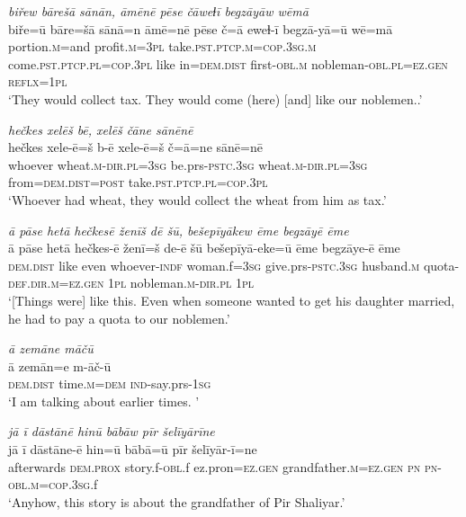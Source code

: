 \ea \label{BP.12}
\textit{biřew bārešā sānān, āmēnē pēse čāweɫī begzāyāw wēmā} \\ 
\gll biře=ū bāre=šā sānā=n āmē=nē pēse č=ā eweɫ-ī begzā-yā=ū wē=mā \\ 
 portion\textsc{.m}=and profit\textsc{.m}\textsc{=3pl} take\textsc{.pst}\textsc{.ptcp}\textsc{.m}\textsc{=cop}\textsc{.3sg}\textsc{.m} come\textsc{.pst}\textsc{.ptcp}\textsc{.pl}\textsc{=cop}\textsc{.3pl} like in=\textsc{dem.dist} first\textsc{-obl}\textsc{.m} nobleman\textsc{-obl}\textsc{.pl}\textsc{=ez.gen} \textsc{reflx}\textsc{=\textsc{1pl}} \\ 
\glt `They would collect tax. They would come (here) [and] like our noblemen..'
\z 
 
\ea \label{BP.15}
\textit{hečkes xelēš bē, xelēš čāne sānēnē} \\ 
\gll hečkes xele-ē=š b-ē xele-ē=š č=ā=ne sānē=nē \\ 
 whoever wheat\textsc{.m}\textsc{-dir}\textsc{.pl}\textsc{=3sg} be.prs\textsc{-pstc}\textsc{.3sg} wheat\textsc{.m}\textsc{-dir}\textsc{.pl}\textsc{=3sg} from=\textsc{dem.dist}\textsc{=\textsc{post}} take\textsc{.pst}\textsc{.ptcp}\textsc{.pl}\textsc{=cop}\textsc{.3pl} \\ 
\glt `Whoever had wheat, they would collect the wheat from him as tax.'
\z 
 
\ea \label{BP.17}
\textit{ā pāse hetā hečkesē ženīš dē šū, bešepīyākew ēme begzāyē ēme} \\ 
\gll ā pāse hetā hečkes-ē ženī=š de-ē šū bešepīyā-eke=ū ēme begzāye-ē ēme \\ 
 \textsc{dem.dist} like even whoever\textsc{-indf} woman.f\textsc{=3sg} give.prs\textsc{-pstc}\textsc{.3sg} husband\textsc{.m} quota\textsc{-def}\textsc{.dir}\textsc{.m}\textsc{=ez.gen} \textsc{1pl} nobleman\textsc{.m}\textsc{-dir}\textsc{.pl} \textsc{1pl} \\ 
\glt `[Things were] like this. Even when someone wanted to get his daughter married, he had to pay a quota  to our noblemen.'
\z 
 
\ea \label{BP.19}
\textit{ā zemāne māčū} \\ 
\gll ā zemān=e m-āč-ū \\ 
 \textsc{dem.dist} time\textsc{.m}\textsc{=dem} \textsc{ind-}say.prs\textsc{-\textsc{1sg}} \\ 
\glt `I am talking about earlier times. '
\z 
 
\ea \label{BP.20}
\textit{jā ī dāstānē hinū bābāw pīr šelīyārīne} \\ 
\gll jā ī dāstāne-ē hin=ū bābā=ū pīr šelīyār-ī=ne \\ 
 afterwards \textsc{dem.prox} story.f\textsc{-obl}.f ez.pron\textsc{=ez.gen} grandfather\textsc{.m}\textsc{=ez.gen} \textsc{pn} \textsc{pn}\textsc{-obl}\textsc{.m}\textsc{=cop}\textsc{.3sg}.f \\ 
\glt `Anyhow, this story is about the grandfather of Pir Shaliyar.'
\z 
 
